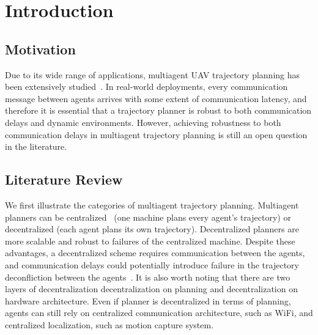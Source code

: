 \chapter{Introduction}

\section{Motivation}

Due to its wide range of applications, multiagent UAV trajectory planning has been extensively studied~\cite{peng2022obstacle, batra_decentralized_2022, ryou_cooperative_2022, vinod_safe_2022, kuwata_cooperative_2011}. 
In real-world deployments, every communication message between agents arrives with some extent of communication latency, and therefore it is essential that a trajectory planner is robust to both communication delays and dynamic environments. However, achieving robustness to both communication delays in multiagent trajectory planning is still an open question in the literature. 

\section{Literature Review}\label{sec:literature_review}

We first illustrate the categories of multiagent trajectory planning. Multiagent planners can be centralized~\cite{park_efficient_2020, sharon_conflict-based_2015, robinson_efficient_2018} (one machine plans every agent's trajectory) or decentralized \cite{tordesillas_mader_2022, zhou_ego-swarm_2020, lusk_distributed_2020} (each agent plans its own trajectory).
Decentralized planners are more scalable and robust to failures of the centralized machine. Despite these advantages, a decentralized scheme requires communication between the agents, and communication delays could potentially introduce failure in the trajectory deconfliction between the agents~\cite{gielis_critical_2022}. 
It is also worth noting that there are two layers of decentralization \textemdash decentralization on planning and decentralization on hardware architecture. Even if planner is decentralized in terms of planning, agents can still rely on centralized communication architecture, such as WiFi, and centralized localization, such as motion capture system. 

